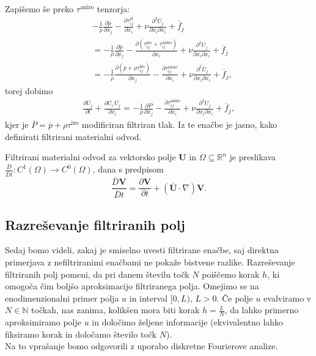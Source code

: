 \documentclass[mat2, tisk]{fmfdelo}
\newcommand{\R}{\mathbb R}
\newcommand{\N}{\mathbb N}
\newcommand{\bd}{\textbf}
\begin{document}
Zapišemo še preko $\tau^\text{anizo}$ tenzorja:
\begin{align*}
&-\frac{1}{\rho} \frac{\partial \overline{p}}{\partial x_j} - \frac{\partial \tau_{ij}^R}{\partial x_i}+ \nu \frac{\partial^2 \overline{U}_j}{\partial x_i \partial x_i} + \overline{f}_j \\[1mm]
&=-\frac{1}{\rho} \frac{\partial \overline{p}}{\partial x_j} - \frac{\partial (\tau^\text{izo}_{ij} + \tau^\text{anizo}_{ij}) }{\partial x_i}+ \nu \frac{\partial^2 \overline{U}_j}{\partial x_i \partial x_i} + \overline{f}_j \\[1mm]
&=-\frac{1}{\rho} \frac{\partial (\overline{p} + \rho\tau^\text{izo}_{ij})}{\partial x_j} - \frac{\partial \tau^\text{anizo}_{ij} }{\partial x_i}+ \nu \frac{\partial^2 \overline{U}_j}{\partial x_i \partial x_i} + \overline{f}_j,
\end{align*}
torej dobimo
\begin{align*}
\frac{\partial \overline{U}_j}{\partial t} + \frac{\partial \overline{U_i}\, \overline{U_j}}{\partial x_i} = -\frac{1}{\rho} \frac{\partial \overline{P}}{\partial x_j} 
- \frac{\partial \tau_{ij}^\text{anizo}}{\partial x_i}+ \nu \frac{\partial^2 \overline{U}_j}{\partial x_i \partial x_i} + \overline{f}_j,
\end{align*}
kjer je $\overline{P} = \overline{p} + \rho\tau^\text{izo}$ modificiran filtriran tlak. Iz te enačbe je jasno, kako definirati filtrirani materialni odvod.
\begin{definicija}
Filtrirani materialni odvod za vektorsko polje $\bd{U}$ in $\Omega \subseteq \R^n$ je preslikava 
$\frac{\overline{D}}{\overline{D}t}: C^1(\Omega) \rightarrow C^0(\Omega)$, dana s predpisom
\begin{equation*}
\frac{\overline{D} \bd{V}}{\overline{D}t} = \frac{\partial \bd{V}}{\partial t} + (\overline{\bd{U}}\cdot \nabla)\bd{V}.
\end{equation*}
\end{definicija}

\subsection{Razreševanje filtriranih polj}

Sedaj bomo videli, zakaj je smiselno uvesti filtrirane enačbe, saj 
direktna primerjava z nefiltriranimi enačbami ne pokaže bistvene razlike.
Razreševanje filtriranih polj pomeni, da pri danem številu točk $N$ 
poiščemo korak $h$, ki omogoča čim boljšo aproksimacijo filtriranega polja.
Omejimo se na enodimenzionalni primer polja $u$ in interval $[0, L)$, 
$L > 0$. Če polje $u$ evalviramo v $N \in \N$ točkah, nas zanima, 
kolikšen mora biti korak $h = \frac{L}{N}$, da lahko primerno aproksimiramo 
polje $u$ in določimo željene informacije (ekvivalentno lahko fiksiramo 
korak in določamo število točk $N$). \\
Na to vprašanje bomo odgovorili z uporabo diskretne Fourierove analize. 
\end{document}
